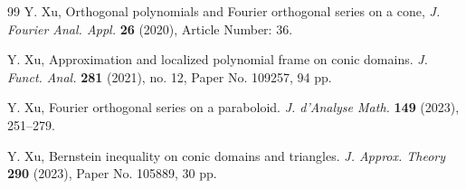 \documentclass{amsart}
\theoremstyle{remark}
\begin{document}
\begin{thebibliography}{99}
       Y. Xu, 
       Orthogonal polynomials and Fourier orthogonal series on a cone, 
       {\it J. Fourier Anal. Appl.} \textbf{26} (2020), Article Number: 36.         
        
       Y. Xu, 
        Approximation and localized polynomial frame on conic domains.  
        \textit{J. Funct. Anal.} \textbf{281} (2021), no. 12, Paper No. 109257, 94 pp.

         Y. Xu, 
         Fourier orthogonal series on a paraboloid. 
         \textit{J. d'Analyse Math.} \textbf{149} (2023), 251--279. 
          
        Y. Xu,
        Bernstein inequality on conic domains and triangles. 
        \textit{J. Approx. Theory} \textbf{290} (2023), Paper No. 105889, 30 pp.    
                
\end{thebibliography}

\end{document}

